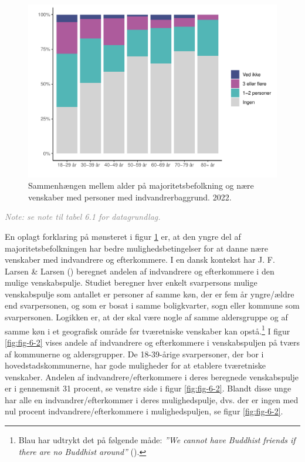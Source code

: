\documentclass[
]{book}
\begin{document}
\begin{figure}
\includegraphics[width=1\linewidth]{en-befolkning-blander-sig_files/figure-latex/fig-6-1-1} \caption{Sammenhængen mellem alder på majoritetsbefolkning og nære venskaber med personer med indvandrerbaggrund. 2022.}\label{fig:fig-6-1}
\end{figure}

\begin{footnotesize}\textit{\textcolor{gray}{
Note: se note til tabel 6.1 for datagrundlag.
}}
\end{footnotesize}

En oplagt forklaring på mønsteret i figur \ref{fig:fig-6-1} er, at den yngre del af majoritetsbefolkningen har bedre mulighedsbetingelser for at danne nære venskaber med indvandrere og efterkommere. I en dansk kontekst har J. F. Larsen \& Larsen () beregnet andelen af indvandrere og efterkommere i den mulige venskabspulje. Studiet beregner hver enkelt svarpersons mulige venskabspulje som antallet er personer af samme køn, der er fem år yngre/ældre end svarpersonen, og som er bosat i samme boligkvarter, sogn eller kommune som svarpersonen. Logikken er, at der skal være nogle af samme aldersgruppe og af samme køn i et geografisk område før tværetniske venskaber kan opstå.\footnote{Blau har udtrykt det på følgende måde: \emph{''We cannot have Buddhist friends if there are no Buddhist around''} ().} I figur \ref{fig:fig-6-2} vises andele af indvandrere og efterkommere i venskabspuljen på tværs af kommunerne og aldersgrupper. De 18-39-årige svarpersoner, der bor i hovedstadskommunerne, har gode muligheder for at etablere tværetniske venskaber. Andelen af indvandrere/efterkommere i deres beregnede venskabspulje er i gennemsnit 31 procent, se venstre side i figur \ref{fig:fig-6-2}. Blandt disse unge har alle en indvandrer/efterkommer i deres mulighedspulje, dvs. der er ingen med nul procent indvandrere/efterkommere i mulighedspuljen, se figur \ref{fig:fig-6-2}.
\end{document}
